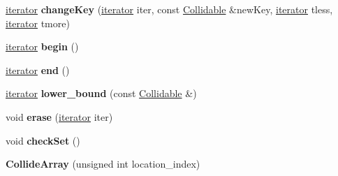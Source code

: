 \begin{DoxyCompactItemize}
\item 
\hyperlink{classCollidable}{iterator} {\bfseries change\+Key} (\hyperlink{classCollidable}{iterator} iter, const \hyperlink{classCollidable}{Collidable} \&new\+Key, \hyperlink{classCollidable}{iterator} tless, \hyperlink{classCollidable}{iterator} tmore)\hypertarget{classCollideArray_ad6f18c82c75761d3c906437977dfd98b}{}\label{classCollideArray_ad6f18c82c75761d3c906437977dfd98b}

\item 
\hyperlink{classCollidable}{iterator} {\bfseries begin} ()\hypertarget{classCollideArray_ad0d128b3845e2e7c2ebd9bfb59f39d34}{}\label{classCollideArray_ad0d128b3845e2e7c2ebd9bfb59f39d34}

\item 
\hyperlink{classCollidable}{iterator} {\bfseries end} ()\hypertarget{classCollideArray_af473a2cab73491c3f3356645073def71}{}\label{classCollideArray_af473a2cab73491c3f3356645073def71}

\item 
\hyperlink{classCollidable}{iterator} {\bfseries lower\+\_\+bound} (const \hyperlink{classCollidable}{Collidable} \&)\hypertarget{classCollideArray_ac8c729aea446c3a31dfe6296bc976563}{}\label{classCollideArray_ac8c729aea446c3a31dfe6296bc976563}

\item 
void {\bfseries erase} (\hyperlink{classCollidable}{iterator} iter)\hypertarget{classCollideArray_af469813547eba4bf7d7d37d437a65653}{}\label{classCollideArray_af469813547eba4bf7d7d37d437a65653}

\item 
void {\bfseries check\+Set} ()\hypertarget{classCollideArray_ac9f171203fb819774eb66a57cd227596}{}\label{classCollideArray_ac9f171203fb819774eb66a57cd227596}

\item 
{\bfseries Collide\+Array} (unsigned int location\+\_\+index)\hypertarget{classCollideArray_a5e269c62c3fed0a3a4b1a09c85f12e3a}{}\label{classCollideArray_a5e269c62c3fed0a3a4b1a09c85f12e3a}

\end{DoxyCompactItemize}
